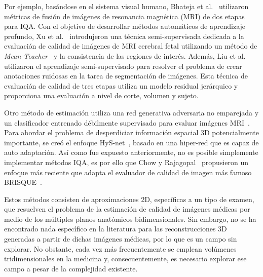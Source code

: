 Por ejemplo, basándose en el sistema visual humano, 
Bhateja et al.~\cite{MultiModalMRIFusionMethod} utilizaron métricas de fusión
de imágenes de resonancia magnética (MRI) de dos etapas para IQA.
Con el objetivo de desarrollar métodos automáticos de aprendizaje profundo,
Xu et al.~\cite{SemiSupervisedMRIFetalBrain} introdujeron una técnica semi-supervisada dedicada a la evaluación de 
calidad de imágenes de MRI cerebral fetal utilizando un método de 
\emph{Mean Teacher}~\cite{MeanTeacher} y la consistencia de las regiones de interés. 
Además, Liu et al.~\cite{IQAForPediatricMRIWithNoisySegmentation} utilizaron el aprendizaje semi-supervisado para resolver 
el problema de crear anotaciones ruidosas en la tarea de segmentación de imágenes. 
Esta técnica de evaluación de calidad de tres etapas utiliza un modelo residual 
jerárquico y proporciona una evaluación a nivel de corte, volumen y sujeto. 

Otro método de estimación utiliza una red generativa adversaria no emparejada 
y un clasificador entrenado débilmente supervisado para evaluar imágenes MRI~\cite{MIGAN}.
Para abordar el problema de desperdiciar información espacial 3D potencialmente importante, 
se creó el enfoque HyS-net~\cite{Hys-net}, basado en una hiper-red que es capaz de 
auto adaptación. Así como fue expuesto anteriormente, no es posible 
simplemente implementar métodos IQA, es por ello que Chow y Rajagopal~\cite{MedicalBRISQUE} 
propusieron un enfoque más reciente que adapta el evaluador de calidad de imagen más famoso BRISQUE~\cite{BRISQUE}.

Estos métodos consisten de aproximaciones 2D, específicas a un tipo de examen, 
que resuelven el problema de la estimación de calidad de imágenes médicas
por medio de los múltiples planos anatómicos bidimensionales. 
Sin embargo, no se ha encontrado nada específico en la literatura para las 
reconstrucciones 3D generadas a partir de dichas imágenes médicas, por lo que es un campo sin explorar. 
No obstante, cada vez más frecuentemente se emplean 
volúmenes tridimensionales en la medicina y, consecuentemente, es necesario explorar ese 
campo a pesar de la complejidad existente.
